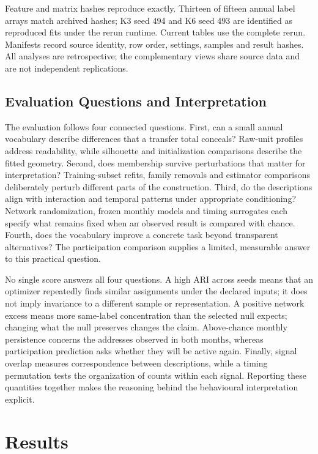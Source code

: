 \documentclass[journal,letterpaper]{IEEEtran}
\begin{document}
Feature and matrix hashes reproduce exactly. Thirteen of fifteen annual label arrays match archived hashes; K3 seed 494 and K6 seed 493 are identified as reproduced fits under the rerun runtime. Current tables use the complete rerun. Manifests record source identity, row order, settings, samples and result hashes. All analyses are retrospective; the complementary views share source data and are not independent replications.

\subsection{Evaluation Questions and Interpretation}
The evaluation follows four connected questions. First, can a small annual vocabulary describe differences that a transfer total conceals? Raw-unit profiles address readability, while silhouette and initialization comparisons describe the fitted geometry. Second, does membership survive perturbations that matter for interpretation? Training-subset refits, family removals and estimator comparisons deliberately perturb different parts of the construction. Third, do the descriptions align with interaction and temporal patterns under appropriate conditioning? Network randomization, frozen monthly models and timing surrogates each specify what remains fixed when an observed result is compared with chance. Fourth, does the vocabulary improve a concrete task beyond transparent alternatives? The participation comparison supplies a limited, measurable answer to this practical question.

No single score answers all four questions. A high ARI across seeds means that an optimizer repeatedly finds similar assignments under the declared inputs; it does not imply invariance to a different sample or representation. A positive network excess means more same-label concentration than the selected null expects; changing what the null preserves changes the claim. Above-chance monthly persistence concerns the addresses observed in both months, whereas participation prediction asks whether they will be active again. Finally, signal overlap measures correspondence between descriptions, while a timing permutation tests the organization of counts within each signal. Reporting these quantities together makes the reasoning behind the behavioural interpretation explicit.

\section{Results}
\end{document}
